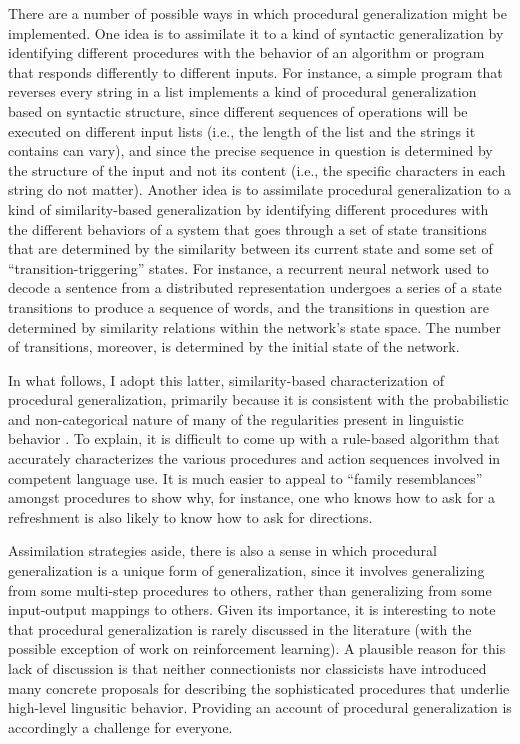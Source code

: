 There are a number of possible ways in which procedural generalization might be implemented. One idea is to assimilate it to a kind of syntactic generalization by identifying different procedures with the behavior of an algorithm or program that responds differently to different inputs. For instance, a simple program that reverses every string in a list implements a kind of procedural generalization based on syntactic structure, since different sequences of operations will be executed on different input lists (i.e., the length of the list and the strings it contains can vary), and since the precise sequence in question is determined by the structure of the input and not its content (i.e., the specific characters in each string do not matter). Another idea is to assimilate procedural generalization to a kind of similarity-based generalization by identifying different procedures with the different behaviors of a system that goes through a set of state transitions that are determined by the similarity between its current state and some set of ``transition-triggering'' states. For instance, a recurrent neural network used to decode a sentence from a distributed representation undergoes a series of a state transitions to produce a sequence of words, and the transitions in question are determined by similarity relations within the network's state space. The number of transitions, moreover, is determined by the initial state of the network.

In what follows, I adopt this latter, similarity-based characterization of procedural generalization, primarily because it is consistent with the probabilistic and non-categorical nature of many of the regularities present in linguistic behavior \citep{Seidenburg:1997,Manning:2015}. To explain, it is difficult to come up with a rule-based algorithm that accurately characterizes the various procedures and action sequences involved in competent language use. It is much easier to appeal to ``family resemblances'' amongst procedures to show why, for instance, one who knows how to ask for a refreshment is also likely to know how to ask for directions.

Assimilation strategies aside, there is also a sense in which procedural generalization is a unique form of generalization, since it involves generalizing from some multi-step procedures to others, rather than generalizing from some input-output mappings to others. Given its importance, it is interesting to note that procedural generalization is rarely discussed in the literature (with the possible exception of work on reinforcement learning\citep[e.g.][]{Mnih:2015,Eliasmith:2012}). A plausible reason for this lack of discussion is that neither connectionists nor classicists have introduced many concrete proposals for describing the sophisticated procedures that underlie high-level lingusitic behavior. Providing an account of procedural generalization is accordingly a challenge for everyone. 

